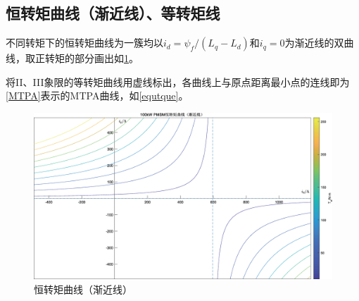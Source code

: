 \documentclass[UTF8]{ctexart}
\numberwithin{figure}{section}
\numberwithin{table}{section}
\begin{document}
\subsection{恒转矩曲线（渐近线）、等转矩线}
\label{subsection:2.2}

不同转矩下的恒转矩曲线为一簇均以$i_d=\psi_f/(L_q-L_d)$和$i_q=0$为渐近线的双曲线，取正转矩的部分画出如\cref{constque}。

将II、III象限的等转矩曲线用虚线标出，各曲线上与原点距离最小点的连线即为\cref{MTPA}表示的MTPA曲线，如\cref{equtque}。

\begin{figure}[htbp]
	\centering
	\begin{minipage}[b]{0.8\textwidth}
		\centering
		\includegraphics[width=\textwidth]{1}
		\caption{恒转矩曲线（渐近线）}
		\label{constque}
	\end{minipage}
	\begin{minipage}[b]{0.8\textwidth}
		\centering

\end{minipage}
\end{figure}
\end{document}
